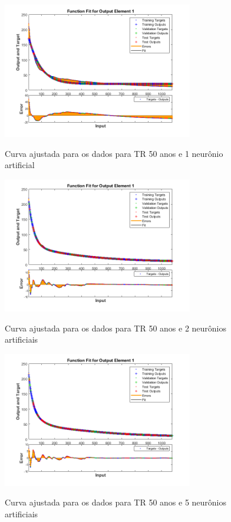 \begin{figure}[h]
    \caption{Curva ajustada para os dados para TR 50 anos e 1 neurônio artificial}
    \centering
    \includegraphics[width=0.74\textwidth]{Textuais/Figuras/NN/tr50-1neuronio.png}
    \label{fig:tr50-1n}
\end{figure}

\begin{figure}[h]
    \caption{Curva ajustada para os dados para TR 50 anos e 2 neurônios artificiais}
    \centering
    \includegraphics[width=0.74\textwidth]{Textuais/Figuras/NN/tr50-2neuronio.png}
    \label{fig:tr50-2n}
\end{figure}

\begin{figure}[h]
    \caption{Curva ajustada para os dados para TR 50 anos e 5 neurônios artificiais}
    \centering
    \includegraphics[width=0.74\textwidth]{Textuais/Figuras/NN/tr50-5neuronio.png}
    \label{fig:tr50-5n}
\end{figure}

